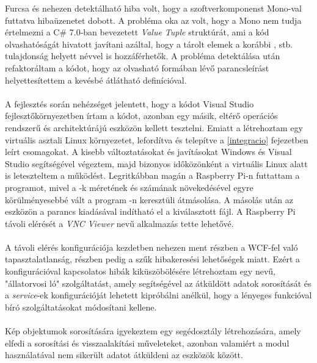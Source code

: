 Furcsa és nehezen detektálható hiba volt, hogy a szoftverkomponenst Mono-val futtatva  hibaüzenetet dobott. A probléma oka az volt, hogy a Mono nem tudja értelmezni a C\# 7.0-ban bevezetett \textit{Value Tuple} struktúrát, ami a kód olvashatóságát hivatott javítani azáltal, hogy a tárolt elemek a korábbi ,  stb. tulajdonság helyett névvel is hozzáférhetők. A probléma detektálása után refaktoráltam a kódot, hogy az olvasható  formában lévő parancsleírást helyettesítettem a kevésbé átlátható  definícióval. \\
\\
A fejlesztés során nehézséget jelentett, hogy a kódot Visual Studio fejlesztőkörnyezetben írtam a kódot, azonban egy másik, eltérő operációs rendszerű és architektúrájú eszközön kellett tesztelni. Emiatt a létrehoztam egy virtuális asztali Linux környezetet, lefordítva és telepítve a \ref{integracio} fejezetben leírt csomagokat. A kisebb változtatásokat és javításokat Windows és Visual Studio segítségével végeztem, majd bizonyos időközönként a virtuális Linux alatt is leteszteltem a működést. Legritkábban magán a Raspberry Pi-n futtattam a programot, mivel a -k méretének és számának növekedésével egyre körülményesebbé vált a program -n keresztüli átmásolása. A másolás után az eszközön a  parancs kiadásával indítható el a kiválasztott  fájl. A Raspberry Pi távoli elérését a \textit{VNC Viewer} nevű alkalmazás tette lehetővé.\\
\\
A távoli elérés konfigurációja kezdetben nehezen ment részben a WCF-fel való tapasztalatlanság, részben pedig a szűk hibakeresési lehetőségek miatt. Ezért a konfigurációval kapcsolatos hibák kiküszöbölésére létrehoztam egy  nevű, "állatorvosi ló" szolgáltatást, amely segítségével az átküldött adatok sorosítását és a \textit{service}-ek konfigurációját lehetett kipróbálni anélkül, hogy a lényeges funkcióval bíró szolgáltatásokat módosítani kellene.\\
\\
Kép objektumok sorosítására igyekeztem egy segédosztály létrehozására, amely elfedi a sorosítási és visszaalakítási műveleteket, azonban valamiért a modul használatával nem sikerült adatot átküldeni az eszközök között.